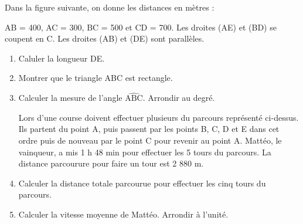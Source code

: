 \documentclass[exercice]{thedocument}%
\begin{document}
%
    \begin{minipage}[c]{.5\linewidth}
        Dans la figure suivante, on donne les distances en mètres :\par\noindent
        AB = 400, AC = 300, BC = 500 et CD = 700.\vskip5pt
        Les droites (AE) et (BD) se coupent en C.\vskip5pt
        Les droites (AB) et (DE) sont parallèles.
    \end{minipage}\hfill
    \begin{minipage}[c]{.4\linewidth}
    \end{minipage}\par
    \begin{enumerate}
        \item Caluler la longueur DE.
        \item Montrer que le triangle ABC est rectangle.
        \item Calculer la mesure de l'angle $\widehat{\text{ABC}}$. Arrondir au degré.
        \par\medskip\noindent
        \begingroup\leavevmode\hspace*{-\leftmargin}%
            \begin{minipage}{.9\linewidth}
                Lors d'une course doivent effectuer plusieurs du parcours représenté ci-dessus.
                Ils partent du point A, puis passent par les points B, C, D et E dans cet
                ordre puis de nouveau par le point C pour revenir au point A.\vskip5pt\noindent
                Mattéo, le vainqueur, a mis 1 h 48 min pour effectuer les 5 tours du parcours.
                La distance parcourure pour faire un tour est 2 880 m.
            \end{minipage}
        \endgroup
        \item Calculer la distance totale parcourue pour effectuer les cinq
        tours du parcours.
        \item Calculer la vitesse moyenne de Mattéo. Arrondir à l'unité.
    \end{enumerate}
    \showthesource
\end{document}
